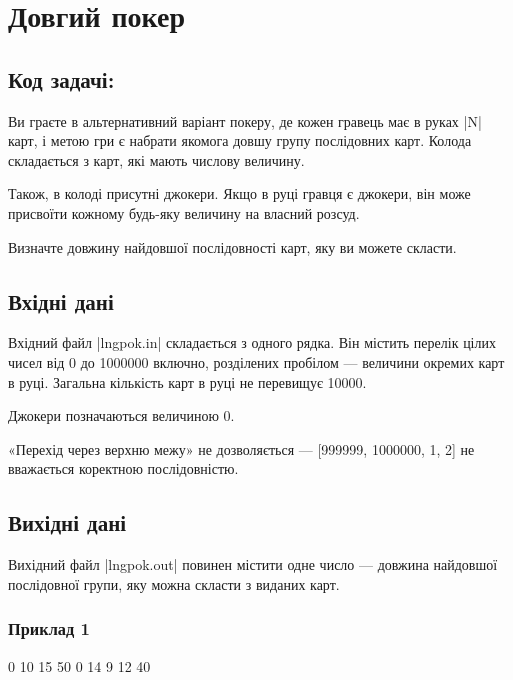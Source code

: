 \documentclass[12pt,a4paper]{article}
\begin{document}
\section*{Довгий покер \hfill {}}


\subsection*{Код задачі: }

Ви граєте в альтернативний варіант покеру, де кожен гравець має в руках |N| карт, і метою гри є набрати якомога довшу групу послідовних карт.
Колода складається з карт, які мають числову величину.

Також, в колоді присутні джокери.
Якщо в руці гравця є джокери, він може присвоїти кожному будь-яку величину на власний розсуд.

Визначте довжину найдовшої послідовності карт, яку ви можете скласти.

\subsection*{Вхідні дані}

Вхідний файл |lngpok.in| складається з одного рядка.
Він містить перелік цілих чисел від 0 до 1000000 включно, розділених пробілом --- величини окремих карт в руці.
Загальна кількість карт в руці не перевищує 10000.

Джокери позначаються величиною 0.

«Перехід через верхню межу» не дозволяється --- [999999, 1000000, 1, 2] не вважається коректною послідовністю.


\subsection*{Вихідні дані}

Вихідний файл |lngpok.out| повинен містити одне число --- довжина найдовшої послідовної групи, яку можна скласти з виданих карт.


\pagebreak


\subsubsection*{Приклад 1}

\textbf{}

\begin{codeblock}
0 10 15 50 0 14 9 12 40
\end{codeblock}
\end{document}
